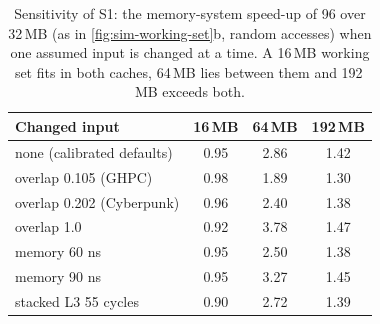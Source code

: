 \begin{table}[htbp]
  \centering
  \caption[Sensitivity of S1 to the assumed inputs]{Sensitivity of S1: the memory-system speed-up of 96 over 32\,MB (as in \cref{fig:sim-working-set}b, random accesses) when one assumed input is changed at a time. A 16\,MB working set fits in both caches, 64\,MB lies between them and 192\,MB exceeds both.}
  \label{tab:sim-sensitivity}
  \small
  \begin{tabular}{@{}lccc@{}}
    \toprule
    \textbf{Changed input} & \textbf{16\,MB} & \textbf{64\,MB} & \textbf{192\,MB} \\
    \midrule
    none (calibrated defaults) & 0.95 & 2.86 & 1.42 \\
    overlap 0.105 (GHPC) & 0.98 & 1.89 & 1.30 \\
    overlap 0.202 (Cyberpunk) & 0.96 & 2.40 & 1.38 \\
    overlap 1.0 & 0.92 & 3.78 & 1.47 \\
    memory 60 ns & 0.95 & 2.50 & 1.38 \\
    memory 90 ns & 0.95 & 3.27 & 1.45 \\
    stacked L3 55 cycles & 0.90 & 2.72 & 1.39 \\
    \bottomrule
  \end{tabular}
\end{table}
